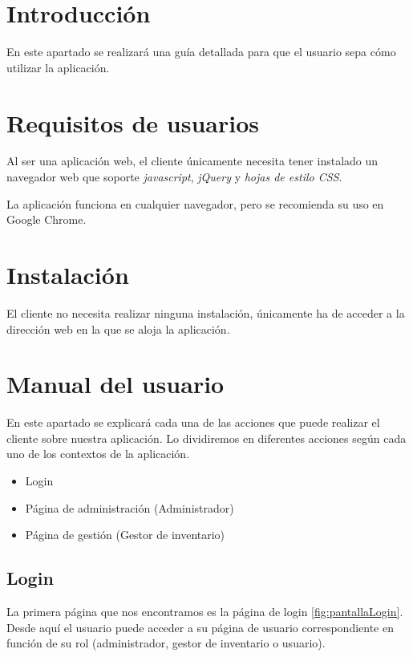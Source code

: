 
\section{Introducción}

En este apartado se realizará una guía detallada para que el usuario sepa cómo utilizar la aplicación.

\section{Requisitos de usuarios}

Al ser una aplicación web, el cliente únicamente necesita tener instalado un navegador web que soporte \textit{javascript}, \textit{jQuery} y \textit{hojas de estilo CSS}. 

La aplicación funciona en cualquier navegador, pero se recomienda su uso en Google Chrome.

\section{Instalación}

El cliente no necesita realizar ninguna instalación, únicamente ha de acceder a la dirección web en la que se aloja la aplicación.

\section{Manual del usuario}

En este apartado se explicará cada una de las acciones que puede realizar el cliente sobre nuestra aplicación. Lo dividiremos en diferentes acciones según cada uno de los contextos de la aplicación.

\begin{itemize}
	\item Login
	\item Página de administración (Administrador)
	\item Página de gestión (Gestor de inventario)
\end{itemize}

\subsection{Login}

La primera página que nos encontramos es la página de login \ref{fig:pantallaLogin}. Desde aquí el usuario puede acceder a su página de usuario correspondiente en función de su rol (administrador, gestor de inventario o usuario).

